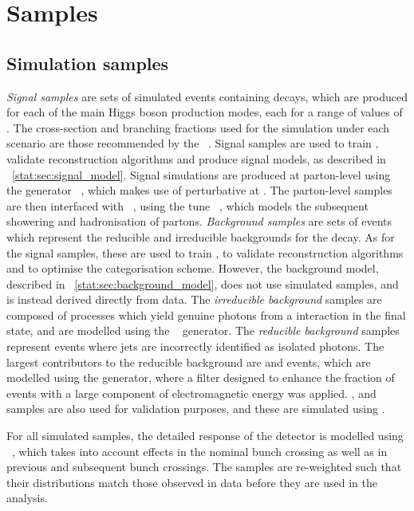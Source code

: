 \section{Samples}
\label{reco:sec:samples}
\subsection{Simulation samples}

\emph{Signal samples} are sets of simulated events containing \Hgg decays, which are produced for each of the main Higgs boson production modes, each for a range of values of \mH. The cross-section and branching fractions used for the simulation under each \mH scenario are those recommended by the \LHCHXSWG~\cite{LHCHXSWGYR4}. Signal samples are used to train \BDT\s, validate reconstruction algorithms and produce signal models, as described in \Sec~\ref{stat:sec:signal_model}. Signal simulations are produced at parton-level using the generator \Madgraph~\cite{Madgraph}, which makes use of perturbative \QCD at \NLO. The parton-level samples are then interfaced with \Pythia~\cite{Pythia8}, using the tune \PythiaTune~\cite{PythiaTune}, which models the subsequent showering and hadronisation of partons. 
\emph{Background samples} are sets of events which represent the reducible and irreducible backgrounds for the \Hgg decay. As for the signal samples, these are used to train \BDT\s, to validate reconstruction algorithms and to optimise the categorisation scheme. However, the background model, described in \Sec~\ref{stat:sec:background_model}, does not use simulated samples, and is instead derived directly from data. The \emph{irreducible background} samples are composed of \SM processes which yield genuine photons from a \pp interaction in the final state, and are modelled using the \Sherpa~\cite{Sherpa} generator. The \emph{reducible background} samples represent events where jets are incorrectly identified as isolated photons. The largest contributors to the reducible background are \gammaJet and \QCDmultijet events, which are modelled using the \Pythia generator, where a filter designed to enhance the fraction of events with a large component of electromagnetic energy was applied. %
\DY, \Wg and \Zg samples are also used for validation purposes, and these are simulated using \Madgraph. 

For all simulated samples, the detailed response of the \CMS detector is modelled using \Geant~\cite{Geant}, which takes into account \PU effects in the nominal bunch crossing as well as in previous and subsequent bunch crossings. The samples are re-weighted such that their \PU distributions match those observed in data before they are used in the analysis.


